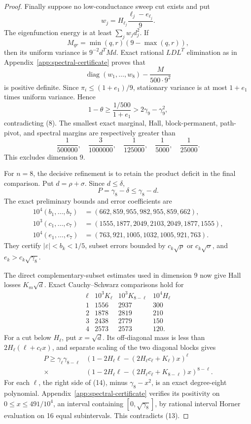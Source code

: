 \documentclass[10pt,a4paper]{amsart}
\theoremstyle{definition}
\theoremstyle{remark}
\newenvironment{exacttable}
  {\begingroup\small
   \setlength{\arraycolsep}{4pt}%
   \renewcommand{\arraystretch}{1.12}}
  {\endgroup}
\begin{document}
\begin{proof}
Finally suppose no low-conductance sweep cut exists and put
\[
w_j=H_{\ell_j}\frac{\ell_j-e_{\ell_j}}9.
\]
The eigenfunction energy is at least \(\sum_jw_jd_j^2\). If
\[
M_{qr}=\min(q,r)(9-\max(q,r)),
\]
then its uniform variance is \(9^{-2}d^TMd\). Exact rational
\(LDL^T\) elimination as in
Appendix~\ref{app:spectral-certificate} proves that
\[
\operatorname{diag}(w_1,\ldots,w_8)-\frac{M}{500\cdot9^2}
\]
is positive definite. Since \(\pi_i\leq(1+e_1)/9\),
stationary variance is at most \(1+e_1\) times uniform variance. Hence
\[
1-\theta\geq\frac{1/500}{1+e_1}>2\gamma_9-\gamma_9^2,
\]
contradicting (8).  The smallest exact marginal, Hall,
block-permanent, path-pivot, and spectral margins are respectively greater
than
\[
\frac1{500000},\quad\frac3{1000000},\quad
\frac1{125000},\quad\frac1{5000},\quad
\frac1{25000}.
\]
This excludes dimension \(9\).

For \(n=8\), the decisive refinement is to retain the product deficit in the
final comparison. Put \(d=\rho+\sigma\). Since \(d\leq\delta\),
\[
P=\gamma_8-\delta\leq\gamma_8-d.                   \tag{13}
\]
The exact preliminary bounds and error coefficients are
\[
\begin{split}
10^4(b_1,\ldots,b_7)&=(662,859,955,982,955,859,662),\\
10^3(c_1,\ldots,c_7)&=(1555,1877,2049,2103,2049,1877,1555),\\
10^4(e_1,\ldots,e_7)&=(763,921,1005,1032,1005,921,763).
\end{split}
\]
They certify \(|\varepsilon|<b_k<1/5\), subset errors bounded by
\(c_k\sqrt\rho\) or \(c_k\sqrt\sigma\), and
\(e_k>c_k\sqrt{\gamma_8}\).

The direct complementary-subset estimates used in dimension \(9\) now give
Hall losses \(K_m\sqrt d\). Exact Cauchy--Schwarz comparisons hold for
\begin{exacttable}
\[
\begin{array}{c|c|c|c}
\ell&10^3K_\ell&10^3K_{8-\ell}&10^4H_\ell\\ \hline
1&1556&2937&300\\
2&1878&2819&210\\
3&2438&2779&150\\
4&2573&2573&120 .
\end{array}
\]
\end{exacttable}
For a cut below \(H_\ell\), put \(x=\sqrt d\). Its off-diagonal mass is less
than \(2H_\ell(\ell+c_\ell x)\), and separate scaling of the two diagonal
blocks gives
\[
\begin{split}
P\geq\gamma_\ell\gamma_{8-\ell}
&\left(1-2H_\ell\ell-(2H_\ell c_\ell+K_\ell)x\right)^\ell\\
\times&
\left(1-2H_\ell\ell-(2H_\ell c_\ell+K_{8-\ell})x\right)^{8-\ell}.
\end{split}                                         \tag{14}
\]
For each \(\ell\), the right side of (14), minus
\(\gamma_8-x^2\), is an exact degree-eight polynomial.
Appendix~\ref{app:spectral-certificate} verifies
its positivity on \(0\leq x\leq491/10^4\), an interval containing
\([0,\sqrt{\gamma_8}]\), by rational interval Horner evaluation on 16 equal
subintervals. This contradicts (13).


\end{proof}
\end{document}
